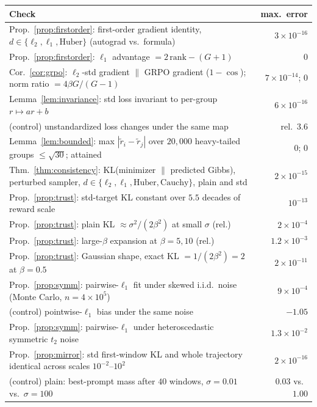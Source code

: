 \begin{center}
\small
\begin{tabular}{p{}r}
\toprule
Check & max.\ error \\
\midrule
Prop.~\ref{prop:firstorder}: first-order gradient identity, $d \in \{\ell_2, \ell_1, \mathrm{Huber}\}$ (autograd vs.\ formula) & $3\times10^{-16}$ \\
Prop.~\ref{prop:firstorder}: $\ell_1$ advantage $= 2\,\mathrm{rank}-(G+1)$ & $0$ \\
Cor.~\ref{cor:grpo}: $\ell_2$-std gradient $\parallel$ GRPO gradient ($1-\cos$); norm ratio $=4\beta G/(G-1)$ & $7\times10^{-14}$; $0$ \\
Lemma~\ref{lem:invariance}: std loss invariant to per-group $r\mapsto ar+b$ & $6\times10^{-16}$ \\
\quad (control) unstandardized loss changes under the same map & rel.\ $3.6$ \\
Lemma~\ref{lem:bounded}: max $|\tilde r_i-\tilde r_j|$ over $20{,}000$ heavy-tailed groups $\le\sqrt{30}$; attained & $0$; $0$ \\
Thm.~\ref{thm:consistency}: KL(minimizer $\|$ predicted Gibbs), perturbed sampler, $d\in\{\ell_2,\ell_1,\mathrm{Huber},\mathrm{Cauchy}\}$, plain and std & $2\times10^{-15}$ \\
Prop.~\ref{prop:trust}: std-target KL constant over $5.5$ decades of reward scale & $10^{-13}$ \\
Prop.~\ref{prop:trust}: plain KL $\approx\sigma^2/(2\beta^2)$ at small $\sigma$ (rel.) & $2\times10^{-4}$ \\
Prop.~\ref{prop:trust}: large-$\beta$ expansion at $\beta=5,10$ (rel.) & $1.2\times10^{-3}$ \\
Prop.~\ref{prop:trust}: Gaussian shape, exact KL $=1/(2\beta^2)=2$ at $\beta=0.5$ & $2\times10^{-11}$ \\
Prop.~\ref{prop:symm}: pairwise-$\ell_1$ fit under skewed i.i.d.\ noise (Monte Carlo, $n=4{\times}10^5$) & $9\times10^{-4}$ \\
\quad (control) pointwise-$\ell_1$ bias under the same noise & $-1.05$ \\
Prop.~\ref{prop:symm}: pairwise-$\ell_1$ under heteroscedastic symmetric $t_2$ noise & $1.3\times10^{-2}$ \\
Prop.~\ref{prop:mirror}: std first-window KL and whole trajectory identical across scales $10^{-2}$--$10^{2}$ & $2\times10^{-16}$ \\
\quad (control) plain: best-prompt mass after $40$ windows, $\sigma=0.01$ vs.\ $\sigma=100$ & $0.03$ vs.\ $1.00$ \\

\end{tabular}
\end{center}
